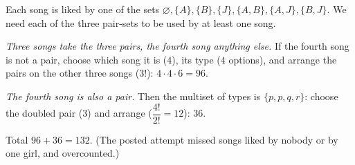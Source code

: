 Each song is liked by one of the sets $\varnothing,\{A\},\{B\},\{J\},\{A,B\},\{A,J\},\{B,J\}$. We need each of the three pair-sets to be used by at least one song.

\emph{Three songs take the three pairs, the fourth song anything else.} If the fourth song is not a pair, choose which song it is ($4$), its type ($4$ options), and arrange the pairs on the other three songs ($3!$): $4\cdot4\cdot6=96$.

\emph{The fourth song is also a pair.} Then the multiset of types is $\{p,p,q,r\}$: choose the doubled pair ($3$) and arrange ($\dfrac{4!}{2!}=12$): $36$.

Total $96+36=\boxed{132}$. (The posted attempt missed songs liked by nobody or by one girl, and overcounted.)
